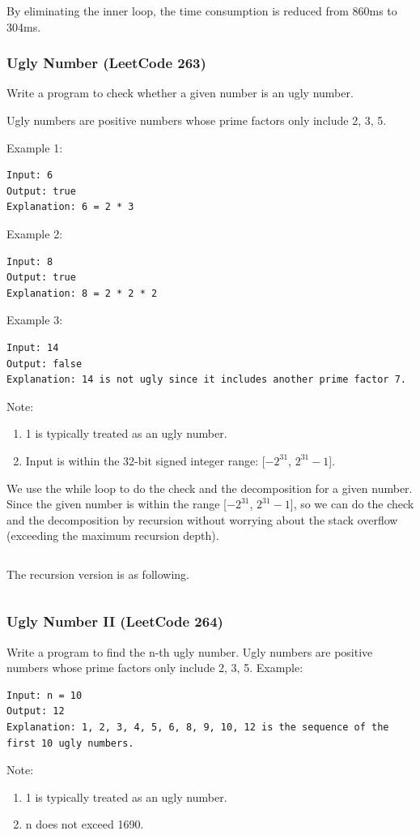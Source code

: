\documentclass[11pt]{article}
\begin{document}
By eliminating the inner loop, the time consumption is reduced from 860ms to 304ms. 

\subsubsection{Ugly Number (LeetCode 263)}
Write a program to check whether a given number is an ugly number.

Ugly numbers are positive numbers whose prime factors only include 2, 3, 5.

Example 1:
\begin{verbatim}
Input: 6
Output: true
Explanation: 6 = 2 * 3
\end{verbatim}

Example 2:
\begin{verbatim}
Input: 8
Output: true
Explanation: 8 = 2 * 2 * 2
\end{verbatim}

Example 3:
\begin{verbatim}
Input: 14
Output: false 
Explanation: 14 is not ugly since it includes another prime factor 7.
\end{verbatim}

Note:
\begin{enumerate}
	\item 1 is typically treated as an ugly number.
	\item Input is within the 32-bit signed integer range: [$-2^{31}$, $2^{31}-1$].
\end{enumerate}

We use the while loop to do the check and the decomposition for a given number. Since the given number is within the range [$-2^{31}$, $2^{31}-1$], so we can do the check and the decomposition by recursion without worrying about the stack overflow (exceeding the maximum recursion depth). 
\inputminted[breaklines=true,frame=leftline, linenos=true]{python}{src/isUgly.py}

The recursion version is as following. 
\inputminted[breaklines=true,frame=leftline, linenos=true]{python}{src/isUgly_recursion.py}

\subsubsection{Ugly Number II (LeetCode 264)}
Write a program to find the n-th ugly number. 
Ugly numbers are positive numbers whose prime factors only include 2, 3, 5. 
Example:
\begin{verbatim}
Input: n = 10
Output: 12
Explanation: 1, 2, 3, 4, 5, 6, 8, 9, 10, 12 is the sequence of the first 10 ugly numbers.
\end{verbatim}
Note:  
\begin{enumerate}
\item 1 is typically treated as an ugly number.
\item n does not exceed 1690.
\end{enumerate}
\end{document}
